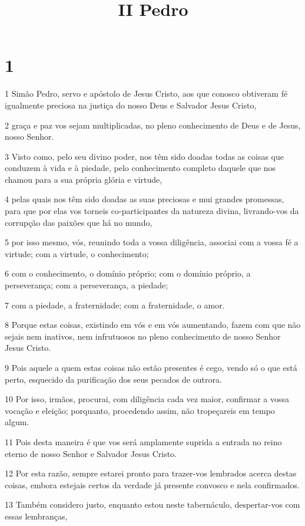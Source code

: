 

\title{II Pedro}


\chapter{1}

\par 1 Simão Pedro, servo e apóstolo de Jesus Cristo, aos que conosco obtiveram fé igualmente preciosa na justiça do nosso Deus e Salvador Jesus Cristo,
\par 2 graça e paz vos sejam multiplicadas, no pleno conhecimento de Deus e de Jesus, nosso Senhor.
\par 3 Visto como, pelo seu divino poder, nos têm sido doadas todas as coisas que conduzem à vida e à piedade, pelo conhecimento completo daquele que nos chamou para a sua própria glória e virtude,
\par 4 pelas quais nos têm sido doadas as suas preciosas e mui grandes promessas, para que por elas vos torneis co-participantes da natureza divina, livrando-vos da corrupção das paixões que há no mundo,
\par 5 por isso mesmo, vós, reunindo toda a vossa diligência, associai com a vossa fé a virtude; com a virtude, o conhecimento;
\par 6 com o conhecimento, o domínio próprio; com o domínio próprio, a perseverança; com a perseverança, a piedade;
\par 7 com a piedade, a fraternidade; com a fraternidade, o amor.
\par 8 Porque estas coisas, existindo em vós e em vós aumentando, fazem com que não sejais nem inativos, nem infrutuosos no pleno conhecimento de nosso Senhor Jesus Cristo.
\par 9 Pois aquele a quem estas coisas não estão presentes é cego, vendo só o que está perto, esquecido da purificação dos seus pecados de outrora.
\par 10 Por isso, irmãos, procurai, com diligência cada vez maior, confirmar a vossa vocação e eleição; porquanto, procedendo assim, não tropeçareis em tempo algum.
\par 11 Pois desta maneira é que vos será amplamente suprida a entrada no reino eterno de nosso Senhor e Salvador Jesus Cristo.
\par 12 Por esta razão, sempre estarei pronto para trazer-vos lembrados acerca destas coisas, embora estejais certos da verdade já presente convosco e nela confirmados.
\par 13 Também considero justo, enquanto estou neste tabernáculo, despertar-vos com essas lembranças,
